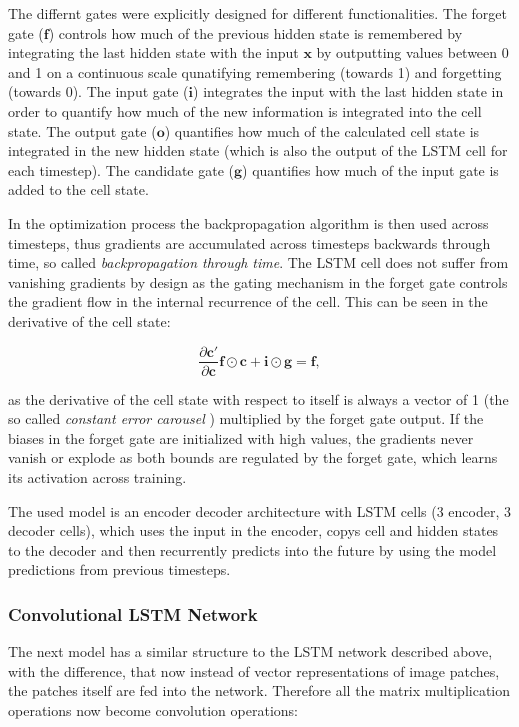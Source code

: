 \documentclass[12pt]{article}
\begin{document}
The differnt gates were explicitly designed for different functionalities.  The forget gate ($\mathbf{f}$) controls how much of the previous hidden state is remembered by integrating the last hidden state with the input $\mathbf{x}$ by outputting values between 0  and 1 on a continuous scale qunatifying remembering (towards 1) and forgetting (towards 0). The input gate ($\mathbf{i}$) integrates the input with the last hidden state in order to quantify how much of the new information is integrated into the cell state. The output gate ($\mathbf{o}$) quantifies how much of the calculated cell state is integrated in the new hidden state (which is also the output of the LSTM cell for each timestep). The candidate gate ($\mathbf{g}$) quantifies how much of the input gate is added to the cell state.

In the optimization process the backpropagation algorithm is then used across timesteps, thus gradients are accumulated across timesteps backwards through time, so called \textit{backpropagation through time}. The LSTM cell does not suffer from vanishing gradients by design as the gating mechanism in the forget gate controls the gradient flow in the internal recurrence of the cell. This can be seen in the derivative of the cell state: 

\begin{equation}
	\frac{\partial \mathbf{c'}}{\partial \mathbf{c}} \mathbf{f} \odot \mathbf{c} + \mathbf{i} \odot \mathbf{g} = \mathbf{f},
\end{equation}

as the derivative of the cell state with respect to itself is always a vector of 1 (the so called \textit{constant error carousel} \citep{hochreiter1997long}) multiplied by the forget gate output. If the biases in the forget gate are initialized with high values, the gradients never vanish or explode as both bounds are regulated by the forget gate, which learns its activation across training. 

The used model is an encoder decoder architecture with LSTM cells (3 encoder, 3 decoder cells), which uses the input in the encoder, copys cell and hidden states to the decoder and then recurrently predicts into the future by using the model predictions from previous timesteps.

\subsubsection{Convolutional LSTM Network}
The next model has a similar structure to the LSTM network described above, with the difference, that now instead of vector representations of image patches, the patches itself are fed into the network. Therefore all the matrix multiplication operations now become convolution operations: 
\end{document}
